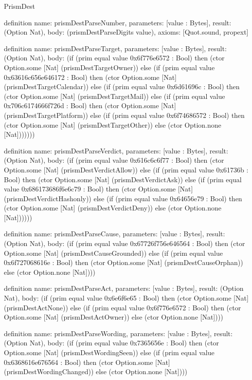 \begin{lexlean}{PrismDest}
\begin{semanticmodule}
definition{
  name: prismDestParseNumber,
  parameters: [value : Bytes],
  result: (Option Nat),
  body: (prismDestParseDigits value),
  axioms: [Quot.sound, propext]
}

definition{
  name: prismDestParseTarget,
  parameters: [value : Bytes],
  result: (Option Nat),
  body: (if (prim equal value 0x6f776e6572 : Bool) then (ctor Option.some [Nat] (prismDestTargetOwner)) else (if (prim equal value 0x63616c656e646172 : Bool) then (ctor Option.some [Nat] (prismDestTargetCalendar)) else (if (prim equal value 0x6d61696c : Bool) then (ctor Option.some [Nat] (prismDestTargetMail)) else (if (prim equal value 0x706c6174666f726d : Bool) then (ctor Option.some [Nat] (prismDestTargetPlatform)) else (if (prim equal value 0x6f74686572 : Bool) then (ctor Option.some [Nat] (prismDestTargetOther)) else (ctor Option.none [Nat]))))))
}

definition{
  name: prismDestParseVerdict,
  parameters: [value : Bytes],
  result: (Option Nat),
  body: (if (prim equal value 0x616c6c6f77 : Bool) then (ctor Option.some [Nat] (prismDestVerdictAllow)) else (if (prim equal value 0x61736b : Bool) then (ctor Option.some [Nat] (prismDestVerdictAsk)) else (if (prim equal value 0x686173686f6e6c79 : Bool) then (ctor Option.some [Nat] (prismDestVerdictHashonly)) else (if (prim equal value 0x64656e79 : Bool) then (ctor Option.some [Nat] (prismDestVerdictDeny)) else (ctor Option.none [Nat])))))
}

definition{
  name: prismDestParseCause,
  parameters: [value : Bytes],
  result: (Option Nat),
  body: (if (prim equal value 0x67726f756e646564 : Bool) then (ctor Option.some [Nat] (prismDestCauseGrounded)) else (if (prim equal value 0x6f727068616e : Bool) then (ctor Option.some [Nat] (prismDestCauseOrphan)) else (ctor Option.none [Nat])))
}

definition{
  name: prismDestParseAct,
  parameters: [value : Bytes],
  result: (Option Nat),
  body: (if (prim equal value 0x6e6f6e65 : Bool) then (ctor Option.some [Nat] (prismDestActNone)) else (if (prim equal value 0x6f776e6572 : Bool) then (ctor Option.some [Nat] (prismDestActOwner)) else (ctor Option.none [Nat])))
}

definition{
  name: prismDestParseWording,
  parameters: [value : Bytes],
  result: (Option Nat),
  body: (if (prim equal value 0x7365656e : Bool) then (ctor Option.some [Nat] (prismDestWordingSeen)) else (if (prim equal value 0x6368616e676564 : Bool) then (ctor Option.some [Nat] (prismDestWordingChanged)) else (ctor Option.none [Nat])))
}


\end{semanticmodule}
\end{lexlean}
